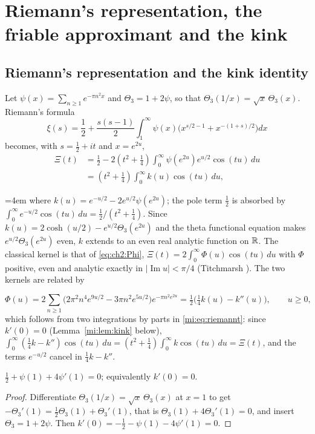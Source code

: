 \section{Riemann's representation, the friable approximant and the kink}\label{mi:sec:friable}

\subsection{Riemann's representation and the kink identity}\label{mi:sec:riemann}

Let $\psi(x)=\sum_{n\ge1}e^{-\pi n^2x}$ and $\Theta_3=1+2\psi$, so that $\Theta_3(1/x)=\sqrt x\,\Theta_3(x)$. Riemann's formula
\[
\xi(s)=\frac12+\frac{s(s-1)}2\int_1^\infty\psi(x)\big(x^{s/2-1}+x^{-(1+s)/2}\big)dx
\]
becomes, with $s=\tfrac12+it$ and $x=e^{2u}$,
\begin{align}\label{mi:eq:riemannt}
\Xi(t)&=\frac12-2\left(t^2+\tfrac14\right)\int_0^\infty\psi(e^{2u})e^{u/2}\cos(tu)\,du\nonumber\\
&=\left(t^2+\tfrac14\right)\int_0^\infty k(u)\cos(tu)\,du,
\end{align}
{\emergencystretch=4em where $k(u)=e^{-u/2}-2e^{u/2}\psi(e^{2u})$; the pole term $\tfrac12$ is absorbed by $\int_0^\infty e^{-u/2}\cos(tu)\,du=\frac12/(t^2+\frac14)$. Since $k(u)=2\cosh(u/2)-e^{u/2}\Theta_3(e^{2u})$ and the theta functional equation makes $e^{u/2}\Theta_3(e^{2u})$ even, $k$ extends to an even real analytic function on $\mathbb{R}$. The classical kernel is that of \eqref{eq:ch2:Phi}, $\Xi(t)=2\int_0^\infty\Phi(u)\cos(tu)\,du$ with $\Phi$ positive, even and analytic exactly in $|\operatorname{Im}u|<\pi/4$ (Titchmarsh \cite[(2.16.1)]{Titchmarsh}). The two kernels are related by\par}
\[
\Phi(u)=2\sum_{n\ge1}\big(2\pi^2n^4e^{9u/2}-3\pi n^2e^{5u/2}\big)e^{-\pi n^2e^{2u}}=\tfrac12\big(\tfrac14k(u)-k''(u)\big),\qquad u\ge0,
\]
which follows from two integrations by parts in \eqref{mi:eq:riemannt}: since $k'(0)=0$ (Lemma~\ref{mi:lem:kink} below), $\int_0^\infty(\tfrac14k-k'')\cos(tu)\,du=(t^2+\tfrac14)\int_0^\infty k\cos(tu)\,du=\Xi(t)$, and the terms $e^{-u/2}$ cancel in $\tfrac14k-k''$.

\begin{lemma}\label{mi:lem:kink}
$\tfrac12+\psi(1)+4\psi'(1)=0$; equivalently $k'(0)=0$.
\end{lemma}

\begin{proof}
Differentiate $\Theta_3(1/x)=\sqrt x\,\Theta_3(x)$ at $x=1$ to get $-\Theta_3'(1)=\tfrac12\Theta_3(1)+\Theta_3'(1)$, that is $\Theta_3(1)+4\Theta_3'(1)=0$, and insert $\Theta_3=1+2\psi$. Then $k'(0)=-\tfrac12-\psi(1)-4\psi'(1)=0$.
\end{proof}

